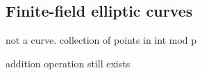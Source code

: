 
\subsection{Finite-field elliptic curves}


not a curve. collection of points in int mod p

addition operation still exists

